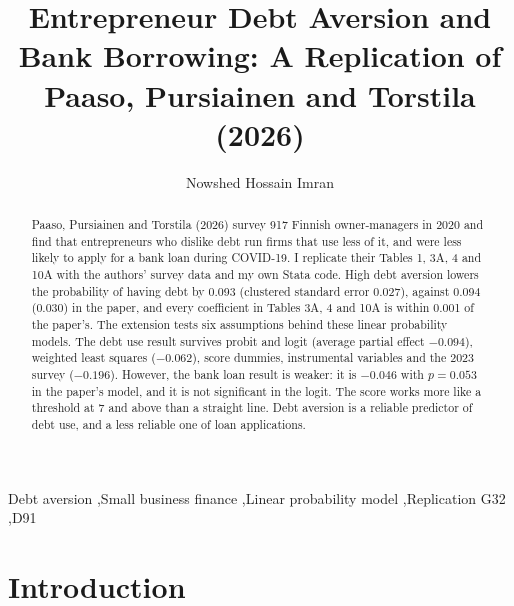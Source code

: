 \documentclass[preprint,letterpaper,11pt,authoryear]{elsarticle}
\begin{document}
\setlength{\emergencystretch}{2em}

\renewcommand{\topfraction}{0.9}
\renewcommand{\textfraction}{0.1}
\renewcommand{\floatpagefraction}{0.8}

\begin{frontmatter}

\title{Entrepreneur Debt Aversion and Bank Borrowing: A Replication of Paaso, Pursiainen and Torstila (2026)}

\author{Nowshed Hossain Imran}

\begin{abstract}
Paaso, Pursiainen and Torstila (2026) survey 917 Finnish owner-managers in 2020 and find that entrepreneurs who dislike debt run firms that use less of it, and were less likely to apply for a bank loan during COVID-19. I replicate their Tables 1, 3A, 4 and 10A with the authors' survey data and my own Stata code. High debt aversion lowers the probability of having debt by 0.093 (clustered standard error 0.027), against 0.094 (0.030) in the paper, and every coefficient in Tables 3A, 4 and 10A is within 0.001 of the paper's. The extension tests six assumptions behind these linear probability models. The debt use result survives probit and logit (average partial effect $-0.094$), weighted least squares ($-0.062$), score dummies, instrumental variables and the 2023 survey ($-0.196$). However, the bank loan result is weaker: it is $-0.046$ with $p = 0.053$ in the paper's model, and it is not significant in the logit. The score works more like a threshold at 7 and above than a straight line. Debt aversion is a reliable predictor of debt use, and a less reliable one of loan applications.
\end{abstract}

\begin{keyword}
Debt aversion \sep Small business finance \sep Linear probability model \sep Replication
\JEL G32 \sep D91
\end{keyword}

\end{frontmatter}

\section{Introduction}
\end{document}
